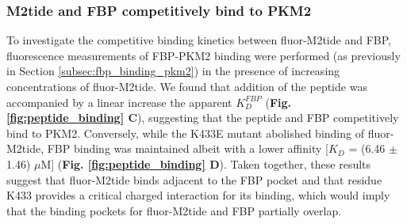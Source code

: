 \subsubsection{M2tide and FBP competitively bind to PKM2}
To investigate the competitive binding kinetics between fluor-M2tide and FBP, fluorescence measurements of FBP-PKM2 binding were performed (as previously in Section \ref{subsec:fbp_binding_pkm2}) in the presence of increasing concentrations of fluor-M2tide. We found that addition of the peptide was accompanied by a linear increase the apparent $K_D^{FBP}$ (\textbf{Fig. \ref{fig:peptide_binding} C}), suggesting that the peptide and FBP competitively bind to PKM2. Conversely, while the K433E mutant abolished binding of fluor-M2tide, FBP binding was maintained albeit with a lower affinity [$K_D$ = (6.46 $\pm$ 1.46) $\mu$M] (\textbf{Fig. \ref{fig:peptide_binding} D}). Taken together, these results suggest that fluor-M2tide binds adjacent to the FBP pocket and that residue K433 provides a critical charged interaction for its binding, which would imply that the binding pockets for fluor-M2tide and FBP partially overlap.
%
%
%
